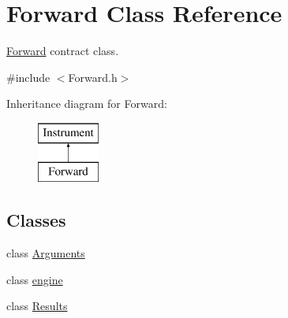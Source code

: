 \hypertarget{class_forward}{}\section{Forward Class Reference}
\label{class_forward}


\hyperlink{class_forward}{Forward} contract class.  




{\ttfamily \#include $<$Forward.\+h$>$}

Inheritance diagram for Forward\+:\begin{figure}[H]
\begin{center}
\leavevmode
\includegraphics[height=2.000000cm]{class_forward}
\end{center}
\end{figure}
\subsection*{Classes}
\begin{DoxyCompactItemize}
\item 
class \hyperlink{class_forward_1_1_arguments}{Arguments}
\item 
class \hyperlink{class_forward_1_1engine}{engine}
\item 
class \hyperlink{class_forward_1_1_results}{Results}
\end{DoxyCompactItemize}

